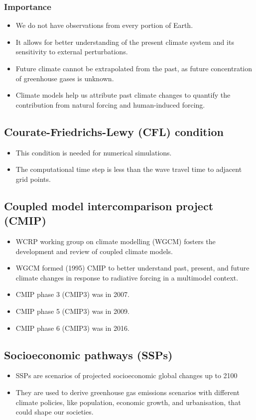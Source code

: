 \documentclass[11pt]{article}
\begin{document}
\subsubsection{Importance}
\label{sec:org3b95c41}
\begin{itemize}
\item We do not have observations from every portion of Earth.
\item It allows for better understanding of the present climate system and its sensitivity to external perturbations.
\item Future climate cannot be extrapolated from the past, as future concentration of greenhouse gases is unknown.
\item Climate models help us attribute past climate changes to quantify the contribution from natural forcing and human-induced forcing.
\end{itemize}

\subsection{Courate-Friedrichs-Lewy (CFL) condition}
\label{sec:org8a849de}
\begin{itemize}
\item This condition is needed for numerical simulations.
\item The computational time step is less than the wave travel time to adjacent grid points.
\end{itemize}

\subsection{Coupled model intercomparison project (CMIP)}
\label{sec:org3236562}
\begin{itemize}
\item WCRP working group on climate modelling (WGCM) fosters the development and review of coupled climate models.
\item WGCM formed (1995) CMIP to better understand past, present, and future climate changes in response to radiative forcing in a multimodel context.
\item CMIP phase 3 (CMIP3) was in 2007.
\item CMIP phase 5 (CMIP3) was in 2009.
\item CMIP phase 6 (CMIP3) was in 2016.
\end{itemize}

\subsection{Socioeconomic pathways (SSPs)}
\label{sec:org38612fd}
\begin{itemize}
\item SSPs are scenarios of projected socioeconomic global changes up to 2100
\item They are used to derive greenhouse gas emissions scenarios with different climate policies, like population, economic growth, and urbanisation, that could shape our societies.
\end{itemize}
\end{document}
